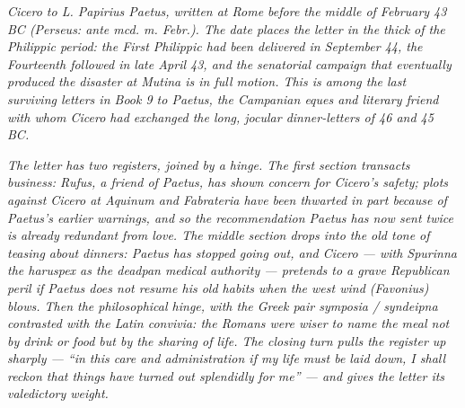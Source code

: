 
\textit{Cicero to L. Papirius Paetus, written at Rome before the
middle of February 43 BC (Perseus: \textit{ante mcd. m. Febr.}). The
date places the letter in the thick of the Philippic period: the
First Philippic had been delivered in September 44, the Fourteenth
followed in late April 43, and the senatorial campaign that
eventually produced the disaster at Mutina is in full motion. This
is among the last surviving letters in Book 9 to Paetus, the
Campanian \textit{eques} and literary friend with whom Cicero had
exchanged the long, jocular dinner-letters of 46 and 45 BC.}

\textit{The letter has two registers, joined by a hinge. The first
section transacts business: Rufus, a friend of Paetus, has shown
concern for Cicero's safety; plots against Cicero at Aquinum and
Fabrateria have been thwarted in part because of Paetus's earlier
warnings, and so the recommendation Paetus has now sent twice is
already redundant from love. The middle section drops into the old
tone of teasing about dinners: Paetus has stopped going out, and
Cicero --- with Spurinna the haruspex as the deadpan medical
authority --- pretends to a grave Republican peril if Paetus does
not resume his old habits when the west wind (Favonius) blows. Then
the philosophical hinge, with the Greek pair \textit{symposia /
syndeipna} contrasted with the Latin \textit{convivia}: the Romans
were wiser to name the meal not by drink or food but by the sharing
of life. The closing turn pulls the register up sharply --- ``in
this care and administration if my life must be laid down, I shall
reckon that things have turned out splendidly for me'' --- and
gives the letter its valedictory weight.}
